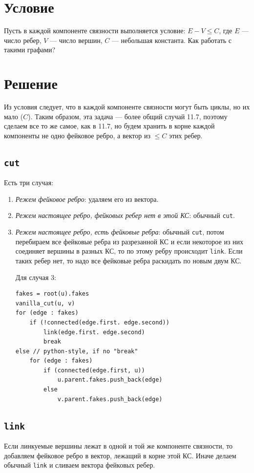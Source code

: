 \documentclass[11pt, a4paper]{article}
\begin{document}
\section*{Условие}

Пусть в каждой компоненте связности выполняется условие: $E - V \leq C$, где $E$ — число ребер,
$V$ — число вершин, $C$ — небольшая константа. Как работать с такими графами?

\section*{Решение}

Из условия следует, что в каждой компоненте связности могут быть циклы, но их мало ($C$). Таким образом, эта задача --- более общий случай 11.7, поэтому сделаем все то же самое, как в 11.7, но будем хранить в корне каждой компоненты не одно фейковое ребро, а вектор из $\leq C$ этих ребер.

\subsection{\texttt{cut}}
Есть три случая:

\begin{enumerate}
    \item \textit{Режем фейковое ребро}: удаляем его из вектора.
    \item \textit{Режем настоящее ребро, фейковых ребер нет в этой КС}: обычный \texttt{cut}.
    \item \textit{Режем настоящее ребро, есть фейковые ребра}: обычный \texttt{cut}, потом перебираем все фейковые ребра из разрезанной КС и если некоторое из них соединяет вершины в разных КС, то по этому ребру происходит \texttt{link}. Если таких ребер нет, то надо все фейковые ребра раскидать по новым двум КС.

          Для случая 3:
          \begin{lstlisting}
fakes = root(u).fakes
vanilla_cut(u, v)
for (edge : fakes)
    if (!connected(edge.first. edge.second))
        link(edge.first. edge.second)
        break
else // python-style, if no "break"
    for (edge : fakes)
        if (connected(edge.first, u))
            u.parent.fakes.push_back(edge)
        else
            v.parent.fakes.push_back(edge)
    \end{lstlisting}
\end{enumerate}

\subsection{\texttt{link}}
Если линкуемые вершины лежат в одной и той же компоненте связности, то добавляем фейковое ребро в вектор, лежащий в корне этой КС. Иначе делаем обычный \texttt{link} и сливаем вектора фейковых ребер.
\end{document}
